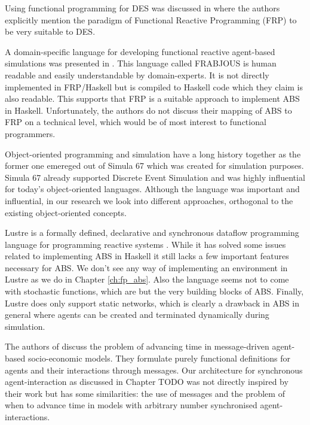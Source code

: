 Using functional programming for DES was discussed in \cite{jankovic_functional_2007} where the authors explicitly mention the paradigm of Functional Reactive Programming (FRP) to be very suitable to DES.

A domain-specific language for developing functional reactive agent-based simulations was presented in \cite{schneider_towards_2012,vendrov_frabjous_2014}. This language called FRABJOUS is human readable and easily understandable by domain-experts. It is not directly implemented in FRP/Haskell but is compiled to Haskell code which they claim is also readable. This supports that FRP is a suitable approach to implement ABS in Haskell. Unfortunately, the authors do not discuss their mapping of ABS to FRP on a technical level, which would be of most interest to functional programmers.

Object-oriented programming and simulation have a long history together as the former one emereged out of Simula 67 \cite{dahl_birth_2002} which was created for simulation purposes. Simula 67 already supported Discrete Event Simulation and was highly influential for today's object-oriented languages. Although the language was important and influential, in our research we look into different approaches, orthogonal to the existing object-oriented concepts.

Lustre is a formally defined, declarative and synchronous dataflow programming language for programming reactive systems \cite{halbwachs_synchronous_1991}. While it has solved some issues related to implementing ABS in Haskell it still lacks a few important features necessary for ABS. We don't see any way of implementing an environment in Lustre as we do in Chapter \ref{ch:fp_abs}. Also the language seems not to come with stochastic functions, which are but the very building blocks of ABS. Finally, Lustre does only support static networks, which is clearly a drawback in ABS in general where agents can be created and terminated dynamically during simulation.

The authors of \cite{botta_time_2010} discuss the problem of advancing time in message-driven agent-based socio-economic models. They formulate purely functional definitions for agents and their interactions through messages. Our architecture for synchronous agent-interaction as discussed in Chapter TODO was not directly inspired by their work but has some similarities: the use of messages and the problem of when to advance time in models with arbitrary number synchronised agent-interactions.

